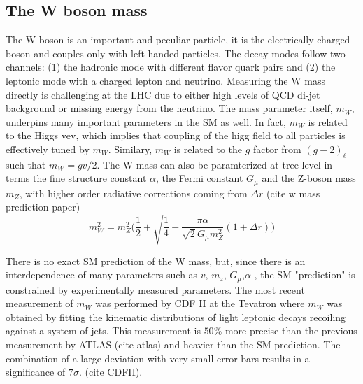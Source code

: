 

\subsection{The W boson mass}

The W boson is an important and peculiar particle, it is the electrically charged boson and couples only with left handed particles. The decay modes follow two channels: (1) the hadronic mode with different flavor quark pairs and (2) the leptonic mode with a charged lepton and neutrino. Measuring the W mass directly is challenging at the LHC due to either high levels of QCD di-jet background or missing energy from the neutrino. The mass parameter itself, $m_W$, underpins many important parameters in the SM as well. In fact, $m_W$ is related to the Higgs vev, which implies that coupling of the higg field to all particles is effectively tuned by $m_W$. Similary, $m_W$ is related to the $g$ factor from $(g-2)_\ell$ such that $m_W = gv/2$. The W mass can also be paramterized at tree level in terms the fine structure constant $\alpha$, the Fermi constant $G_\mu$ and the Z-boson mass $m_Z$, with higher order radiative corrections coming from $\Delta r$  (cite w mass prediction paper)
\begin{equation}
\label{eq:mwequation}
m_W^2 = m_Z^2\Bigg(\frac{1}{2} + \sqrt{\frac{1}{4} - \frac{\pi\alpha}{\sqrt{2}G_\mu m_{Z}^2 }(1+\Delta r) } \Bigg)
\end{equation}

There is no exact SM prediction of the W mass, but, since there is an interdependence of many parameters such as $v$, $m_z$, $G_\mu$,$\alpha$ , the SM "prediction" is constrained by experimentally measured parameters. The most recent measurement of $m_W$ was performed by CDF II at the Tevatron where $m_W$ was obtained by fitting the kinematic distributions of light leptonic decays recoiling against a system of jets. This measurement is $50\%$ more precise than the previous measurement by ATLAS (cite atlas) and heavier than the SM prediction. The combination of a large deviation with very small error bars results in a significance of $7\sigma$. (cite CDFII).  

